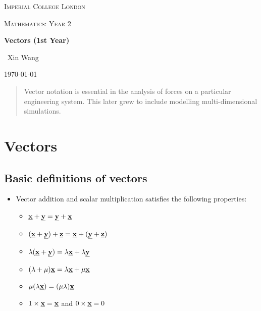 \documentclass[10pt,a4paper]{article}
\begin{document}
\begin{titlepage}
	\centering
	{\scshape\LARGE Imperial College London \par}
	\vspace{1cm}
	{\scshape\Large Mathematics: Year 2\par}
	\vspace{1.5cm}
	{\huge\bfseries Vectors (1st Year)\par}
	\vspace{2cm}
	{\Large\ Xin Wang }
	\vfill
	{\large \today\par}
\end{titlepage}

\begin{abstract}
Vector notation is essential in the analysis of forces on a particular engineering system. This
later grew to include modelling multi-dimensional simulations.
\end{abstract}

\tableofcontents
\pagebreak

\section{Vectors}
\subsection{Basic definitions of vectors}

\begin{itemize}
    \item Vector addition and scalar multiplication satisfies the following properties:
    \begin{itemize}
        \item $\textbf{\underline{x}} + \textbf{\underline{y}} = \textbf{\underline{y}} + \textbf{\underline{x}}$
        \item $(\textbf{\underline{x}}+\textbf{\underline{y}})+\textbf{\underline{z}} =
        \textbf{\underline{x}} + (\textbf{\underline{y}}+\textbf{\underline{z}})$
        \item $\lambda(\textbf{\underline{x}}+\textbf{\underline{y}})=\lambda\textbf{\underline{x}} + \lambda\textbf{\underline{y}}$
        \item $(\lambda+\mu)\textbf{\underline{x}} = \lambda\textbf{\underline{x}} + \mu\textbf{\underline{x}}$
        \item $\mu(\lambda \textbf{\underline{x}})=(\mu\lambda)\textbf{\underline{x}}$
        \item $1\times\textbf{\underline{x}} = \textbf{\underline{x}}$ and $0\times
        \textbf{\underline{x}} = 0$
    \end{itemize}
\end{itemize}
\end{document}
